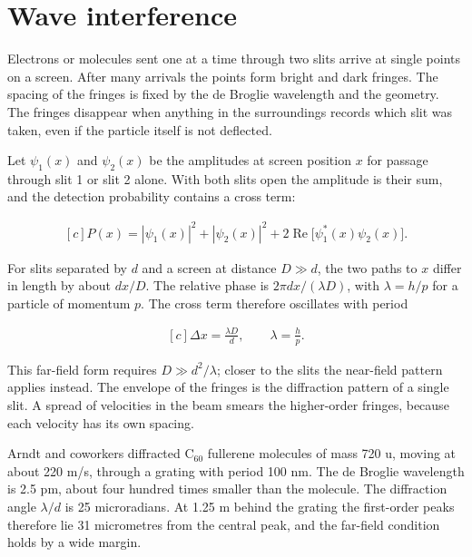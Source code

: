 \documentclass[11pt,oneside]{book}
\newenvironment{centeredalign}{\[\begin{gathered}[c]}{\end{gathered}\]}
\begin{document}
\clearpage

\section{Wave interference}

\label{topic:wave-interference}

Electrons or molecules sent one at a time through two slits arrive at single points on a screen. After many arrivals the points form bright and dark fringes. The spacing of the fringes is fixed by the de Broglie wavelength and the geometry. The fringes disappear when anything in the surroundings records which slit was taken, even if the particle itself is not deflected.

Let \(\psi_1(x)\) and \(\psi_2(x)\) be the amplitudes at screen position \(x\) for passage through slit 1 or slit 2 alone. With both slits open the amplitude is their sum, and the detection probability contains a cross term:

\begin{centeredalign}
P(x)=|\psi_1(x)|^2+|\psi_2(x)|^2+2\operatorname{Re}\big[\psi_1^*(x)\psi_2(x)\big].
\end{centeredalign}

For slits separated by \(d\) and a screen at distance \(D\gg d\), the two paths to \(x\) differ in length by about \(dx/D\). The relative phase is \(2\pi dx/(\lambda D)\), with \(\lambda=h/p\) for a particle of momentum \(p\). The cross term therefore oscillates with period

\begin{centeredalign}
\Delta x=\frac{\lambda D}{d},\qquad \lambda=\frac{h}{p}.
\end{centeredalign}

This far-field form requires \(D\gg d^2/\lambda\); closer to the slits the near-field pattern applies instead. The envelope of the fringes is the diffraction pattern of a single slit. A spread of velocities in the beam smears the higher-order fringes, because each velocity has its own spacing.

Arndt and coworkers diffracted C\(_{60}\) fullerene molecules of mass 720 u, moving at about 220 m/s, through a grating with period 100 nm. The de Broglie wavelength is 2.5 pm, about four hundred times smaller than the molecule. The diffraction angle \(\lambda/d\) is 25 microradians. At 1.25 m behind the grating the first-order peaks therefore lie 31 micrometres from the central peak, and the far-field condition holds by a wide margin.
\end{document}

